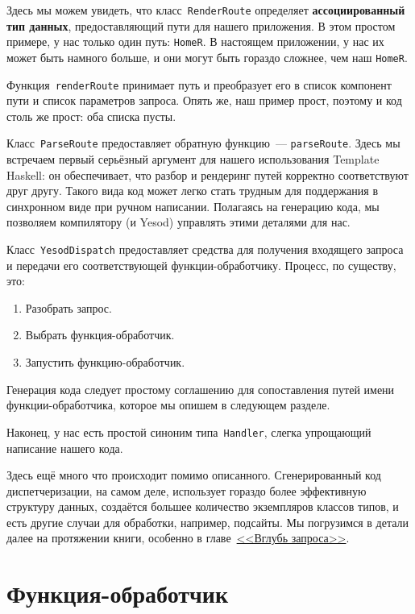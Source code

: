 Здесь мы можем увидеть, что класс~\lstinline'RenderRoute' определяет
\textbf{ассоциированный тип данных}, предоставляющий пути для нашего
приложения. В этом простом примере, у нас только один путь: \lstinline{HomeR}.
В настоящем приложении, у нас их может быть намного больше, и они могут быть
гораздо сложнее, чем наш \lstinline{HomeR}.

Функция~\lstinline{renderRoute} принимает путь и преобразует его в список
компонент пути и список параметров запроса. Опять же, наш пример прост, поэтому
и код столь же прост: оба списка пусты.

Класс~\lstinline{ParseRoute} предоставляет обратную функцию~---
\lstinline{parseRoute}. Здесь мы встречаем первый серьёзный аргумент для нашего
использования Template Haskell: он обеспечивает, что разбор и рендеринг путей
корректно соответствуют друг другу. Такого вида код может легко стать трудным
для поддержания в синхронном виде при ручном написании. Полагаясь на генерацию
кода, мы позволяем компилятору (и Yesod) управлять этими деталями для нас.

Класс~\lstinline{YesodDispatch} предоставляет средства для получения входящего
запроса и передачи его соответствующей функции-обработчику. Процесс, по
существу, это:
\begin{enumerate}
    \item Разобрать запрос.
    \item Выбрать функция-обработчик.
    \item Запустить функцию-обработчик.
\end{enumerate}

Генерация кода следует простому соглашению для сопоставления путей имени
функции-обработчика, которое мы опишем в следующем разделе.

Наконец, у нас есть простой синоним типа~\lstinline{Handler}, слегка упрощающий
написание нашего кода.

Здесь ещё много что происходит помимо описанного. Сгенерированный код
диспетчеризации, на самом деле, использует гораздо более эффективную структуру
данных, создаётся большее количество экземпляров классов типов, и есть другие
случаи для обработки, например, подсайты. Мы погрузимся в детали далее на
протяжении книги, особенно в главе~\hyperref[chap:request]{<<Вглубь запроса>>}.

\section{Функция-обработчик}

